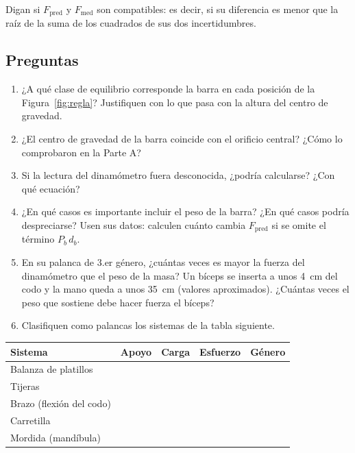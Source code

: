 \documentclass[11pt, letterpaper]{article}
\begin{document}
	\noindent
	Digan si $F_{\text{pred}}$ y $F_{\text{med}}$ son compatibles: es decir, si
	su diferencia es menor que la raíz de la suma de los cuadrados de sus dos
	incertidumbres.
	
	\subsection{Preguntas}
	
	\begin{enumerate}
		\item ¿A qué clase de equilibrio corresponde la barra en cada posición de
		la Figura~\ref{fig:regla}? Justifiquen con lo que pasa con la altura del
		centro de gravedad.
		\item ¿El centro de gravedad de la barra coincide con el orificio central?
		¿Cómo lo comprobaron en la Parte A?
		\item Si la lectura del dinamómetro fuera desconocida, ¿podría
		calcularse? ¿Con qué ecuación?
		\item ¿En qué casos es importante incluir el peso de la barra? ¿En qué
		casos podría despreciarse? Usen sus datos: calculen cuánto cambia
		$F_{\text{pred}}$ si se omite el término $P_b\,d_b$.
		\item En su palanca de 3.er género, ¿cuántas veces es mayor la fuerza del
		dinamómetro que el peso de la masa? Un bíceps se inserta a unos 4~cm del
		codo y la mano queda a unos 35~cm (valores aproximados). ¿Cuántas veces el
		peso que sostiene debe hacer fuerza el bíceps?
		\item Clasifiquen como palancas los sistemas de la tabla siguiente.
	\end{enumerate}
	
	\begin{center}
		\small
		\begin{tabular}{|l|c|c|c|c|}
			\hline
			Sistema & Apoyo & Carga & Esfuerzo & Género \\
			\hline
			\rule{0pt}{3ex} Balanza de platillos & & & & \\ \hline
			\rule{0pt}{3ex} Tijeras & & & & \\ \hline
			\rule{0pt}{3ex} Brazo (flexión del codo) & & & & \\ \hline
			\rule{0pt}{3ex} Carretilla & & & & \\ \hline
			\rule{0pt}{3ex} Mordida (mandíbula) & & & & \\ \hline
		\end{tabular}
	\end{center}
	
\end{document}
